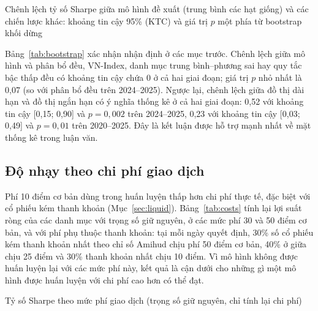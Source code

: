 \begin{table}[ht]
\centering\footnotesize
\setlength{\tabcolsep}{3.5pt}
\caption{Chênh lệch tỷ số Sharpe giữa mô hình đề xuất (trung bình các hạt giống) và các chiến lược khác: khoảng tin cậy 95\% (KTC) và giá trị $p$ một phía từ bootstrap khối dừng}
\label{tab:bootstrap}
\begin{adjustbox}{max width=\textwidth}\end{adjustbox}
\end{table}

Bảng~\ref{tab:bootstrap} xác nhận nhận định ở các mục trước. Chênh lệch giữa mô hình và phân bổ đều, VN-Index, danh mục trung bình--phương sai hay quy tắc bậc thấp đều có khoảng tin cậy chứa 0 ở cả hai giai đoạn; giá trị $p$ nhỏ nhất là 0,07 (so với phân bổ đều trên 2024--2025). Ngược lại, chênh lệch giữa đồ thị dài hạn và đồ thị ngắn hạn có ý nghĩa thống kê ở cả hai giai đoạn: 0,52 với khoảng tin cậy [0,15; 0,90] và $p = 0{,}002$ trên 2024--2025, 0,23 với khoảng tin cậy [0,03; 0,49] và $p = 0{,}01$ trên 2020--2025. Đây là kết luận được hỗ trợ mạnh nhất về mặt thống kê trong luận văn.

\subsection{Độ nhạy theo chi phí giao dịch}

Phí 10 điểm cơ bản dùng trong huấn luyện thấp hơn chi phí thực tế, đặc biệt với cổ phiếu kém thanh khoản (Mục~\ref{sec:liquid}). Bảng~\ref{tab:costs} tính lại lợi suất ròng của các danh mục với trọng số giữ nguyên, ở các mức phí 30 và 50 điểm cơ bản, và với phí phụ thuộc thanh khoản: tại mỗi ngày quyết định, 30\% số cổ phiếu kém thanh khoản nhất theo chỉ số Amihud chịu phí 50 điểm cơ bản, 40\% ở giữa chịu 25 điểm và 30\% thanh khoản nhất chịu 10 điểm. Vì mô hình không được huấn luyện lại với các mức phí này, kết quả là cận dưới cho những gì một mô hình được huấn luyện với chi phí cao hơn có thể đạt.

\begin{table}[ht]
\centering\footnotesize
\setlength{\tabcolsep}{3pt}
\caption{Tỷ số Sharpe theo mức phí giao dịch (trọng số giữ nguyên, chỉ tính lại chi phí)}
\label{tab:costs}
\begin{adjustbox}{max width=\textwidth}\end{adjustbox}
\end{table}

